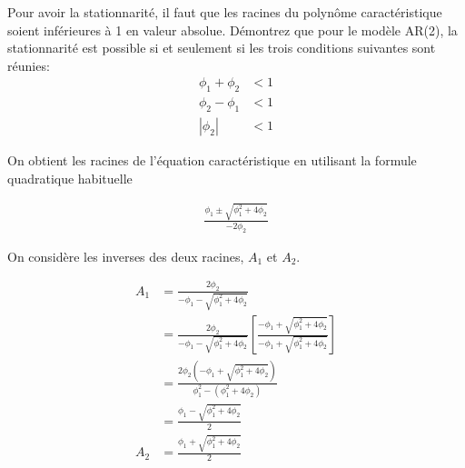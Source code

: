 \begin{exercice}
  Pour avoir la stationnarité, il faut que les racines du polynôme caractéristique soient inférieures à 1 en valeur absolue. Démontrez que pour le modèle AR(2), la stationnarité est possible si et seulement si les trois conditions suivantes sont réunies:
\begin{align*}
  \phi_1 + \phi_2 &< 1 \\
  \phi_2 - \phi_1 &< 1 \\
  |\phi_2| &< 1
\end{align*}
\begin{sol}
  On obtient les racines de l'équation caractéristique en utilisant la formule quadratique habituelle

\begin{align*}
\frac{\phi_1\pm\sqrt{\phi_1^2+4\phi_2}}{-2\phi_2}
\end{align*}

On considère les inverses des deux racines, $A_1$ et $A_2$.

\begin{align*}
A_1 &= \frac{2\phi_2}{-\phi_1-\sqrt{\phi_1^2+4\phi_2}} \\
&= \frac{2\phi_2}{-\phi_1-\sqrt{\phi_1^2+4\phi_2}} \left[\frac{-\phi_1+\sqrt{\phi_1^2+4\phi_2}}{-\phi_1+\sqrt{\phi_1^2+4\phi_2}} \right] \\
&= \frac{2\phi_2(-\phi_1+\sqrt{\phi_1^2+4\phi_2})}{\phi_1^2-(\phi_1^2+4\phi_2)}\\
&= \frac{\phi_1-\sqrt{\phi_1^2+4\phi_2}}{2}\\
A_2 &= \frac{\phi_1+\sqrt{\phi_1^2+4\phi_2}}{2}
\end{align*}


\end{sol}
\end{exercice}

